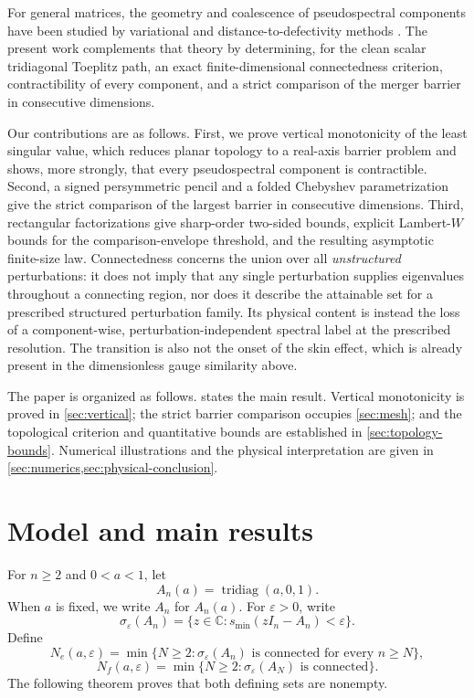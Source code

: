 \documentclass[review,hidelinks,onefignum,onetabnum]{siamart251216}
\DeclareMathOperator{\tridiag}{tridiag}
\newcommand{\C}{\mathbb C}
\begin{document}
For general matrices, the geometry and coalescence of pseudospectral
components have been studied by variational and distance-to-defectivity
methods \cite{AlamEtAl2011,BurkeLewisOverton2003,LewisPang2008}.  The
present work complements that theory by determining, for the clean
scalar tridiagonal Toeplitz path, an exact finite-dimensional
connectedness criterion, contractibility of every component, and a
strict comparison of the merger barrier in consecutive dimensions.

Our contributions are as follows.  First, we prove vertical monotonicity
of the least singular value, which reduces planar topology to a real-axis
barrier problem and shows, more strongly, that every pseudospectral
component is contractible.  Second, a signed persymmetric pencil and a
folded Chebyshev parametrization give the strict comparison of the
largest barrier in consecutive dimensions.  Third, rectangular
factorizations give sharp-order two-sided bounds, explicit Lambert-$W$
bounds for the comparison-envelope threshold, and the resulting asymptotic
finite-size law.  Connectedness concerns the union over all
\emph{unstructured} perturbations: it does not imply that any single
perturbation supplies eigenvalues throughout a connecting region, nor
does it describe the attainable set for a prescribed structured
perturbation family.  Its physical content is instead the loss of a
component-wise, perturbation-independent spectral label at the prescribed
resolution.  The transition is also not the onset of the skin effect, which
is already present in the dimensionless gauge similarity above.

The paper is organized as follows.   states the
main result.  Vertical monotonicity is proved in
\cref{sec:vertical}; the strict barrier comparison occupies
\cref{sec:mesh}; and the topological criterion and quantitative bounds
are established in \cref{sec:topology-bounds}.  Numerical illustrations
and the physical interpretation are given in
\cref{sec:numerics,sec:physical-conclusion}.

\section{Model and main results}\label{sec:main-results}

For $n\geq2$ and $0<a<1$, let
\[
 A_n(a)=\tridiag(a,0,1).
\]
When \(a\) is fixed, we write \(A_n\) for \(A_n(a)\).
For $\varepsilon>0$, write
\[
 \sigma_\varepsilon(A_n)=
 \{z\in\C:s_{\min}(zI_n-A_n)<\varepsilon\}.
\]
Define
\[
 N_e(a,\varepsilon)=\min\{N\geq2:
 \sigma_\varepsilon(A_n)\text{ is connected for every }n\geq N\},
\]
\[
 N_f(a,\varepsilon)=\min\{N\geq2:
 \sigma_\varepsilon(A_N)\text{ is connected}\}.
\]
The following theorem proves that both defining sets are nonempty.
\end{document}
